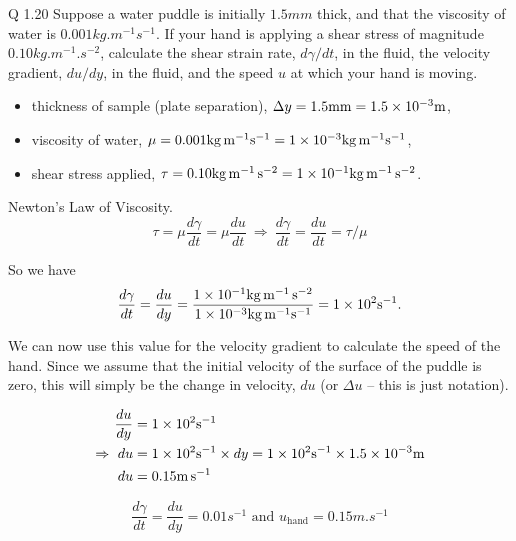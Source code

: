 \begin{question}
  Q 1.20 Suppose a water puddle is initially $1.5\si{mm}$ thick, and that the viscosity of water is $0.001 \si{kg.m^{-1}s^{-1}}$. If your hand is applying a shear stress of magnitude $0.10 \si{kg.m^{-1}.s^{-2}}$, calculate the shear strain rate, $d\gamma/dt$, in the fluid, the velocity gradient, $du/dy$, in the fluid, and the speed $u$ at which your hand is moving.
\end{question}

\begin{solution}

  \begin{itemize}
    \item thickness of sample (plate separation), $\Delta y = 1.5 \si{mm} = 1.5 \x 10^{-3} \si{m}$,
    \item viscosity of water, $\mu = 0.001 \si{kg.m^{-1}s^{-1}} = 1 \x 10^{-3} \si{kg.m^{-1}s^{-1}}$,
    \item shear stress applied, $\tau = 0.10 \si{kg.m^{-1}.s^{-2}} = 1 \x 10^{-1} \si{kg.m^{-1}.s^{-2}}$.
  \end{itemize}

   Newton's Law of Viscosity.
  \begin{equation}
    \tau = \mu \frac{d \gamma}{dt} = \mu \frac{du}{dt} ~\Rightarrow~ \frac{d \gamma}{dt} = \frac{du}{dt} = \tau / \mu
  \end{equation}

  So we have
  \begin{align*}
    \frac{d \gamma}{dt} = \frac{du}{dy} = \frac{ 1 \x 10^{-1} \si{kg.m^{-1}.s^{-2}} }{ 1 \x 10^{-3} \si{kg.m^{-1}s^{-1}} } = 1 \x 10^{2} \si{s^{-1}}.
  \end{align*}

  We can now use this value for the velocity gradient to calculate the speed of the hand. Since we assume that the initial velocity of the surface of the puddle is zero, this will simply be the change in velocity, $d u$ (or $\Delta u$ -- this is just notation).

  \begin{align*}
    \frac{du}{dy} &= 1 \x 10^{2} \si{s^{-1}} \\
    \Rightarrow~ du &= 1 \x 10^{2} \si{s^{-1}} \x dy = 1 \x 10^{2} \si{s^{-1}} \x 1.5 \x 10^{-3} \si{m} \\
    du &= 0.15 \si{m.s^{-1}}
  \end{align*}

  \begin{equation*}
    \boxed{\frac{d \gamma}{dt} = \frac{du}{dy} = 0.01 \si{s^{-1}} \text{ and } u_{\text{hand}} = 0.15 \si{m.s^{-1}} }
  \end{equation*}
\end{solution}

